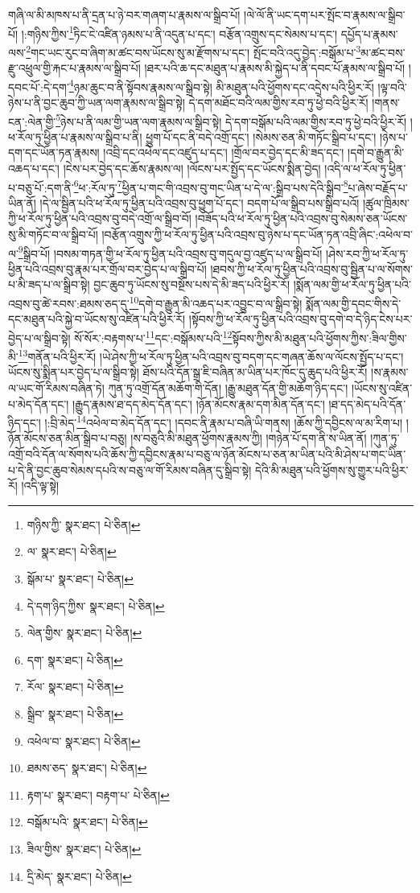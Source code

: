 གཞི་ལ་མི་མཁས་པ་ནི་དྲན་པ་ཉེ་བར་གཞག་པ་རྣམས་ལ་སྒྲིབ་པོ། །ལེ་ལོ་ནི་ཡང་དག་པར་སྤོང་བ་རྣམས་ལ་སྒྲིབ་པོ། །:གཉིས་ཀྱིས་\footnote{གཉིས་ཀྱི་  སྣར་ཐང་།  པེ་ཅིན། }ཏིང་ངེ་འཛིན་ཉམས་པ་ནི་འདུན་པ་དང་། བརྩོན་འགྲུས་དང་སེམས་པ་དང་། དཔྱོད་པ་རྣམས་ལས་\footnote{ལ་  སྣར་ཐང་།  པེ་ཅིན། }གང་ཡང་རུང་བ་ཞིག་མ་ཚང་བས་ཡོངས་སུ་མ་རྫོགས་པ་དང་། སྤོང་བའི་འདུ་བྱེད་:བསྒོམ་པ་\footnote{སྒོམ་པ་  སྣར་ཐང་།  པེ་ཅིན། }མ་ཚང་བས་རྫུ་འཕྲུལ་གྱི་རྐང་པ་རྣམས་ལ་སྒྲིབ་པོ། །ཐར་པའི་ཆ་དང་མཐུན་པ་རྣམས་མི་སྐྱེད་པ་ནི་དབང་པོ་རྣམས་ལ་སྒྲིབ་པོ། །དབང་པོ་:དེ་དག་\footnote{དེ་དག་ཉིད་ཀྱིས་  སྣར་ཐང་།  པེ་ཅིན། }ཉམ་ཆུང་བ་ནི་སྟོབས་རྣམས་ལ་སྒྲིབ་སྟེ། མི་མཐུན་པའི་ཕྱོགས་དང་འདྲེས་པའི་ཕྱིར་རོ། །ལྟ་བའི་ཉེས་པ་ནི་བྱང་ཆུབ་ཀྱི་ཡན་ལག་རྣམས་ལ་སྒྲིབ་སྟེ། དེ་དག་མཐོང་བའི་ལམ་གྱིས་རབ་ཏུ་ཕྱེ་བའི་ཕྱིར་རོ། །གནས་ངན་:ལེན་གྱི་\footnote{ལེན་གྱིས་  སྣར་ཐང་།  པེ་ཅིན། }ཉེས་པ་ནི་ལམ་གྱི་ཡན་ལག་རྣམས་ལ་སྒྲིབ་སྟེ། དེ་དག་བསྒོམ་པའི་ལམ་གྱིས་རབ་ཏུ་ཕྱེ་བའི་ཕྱིར་རོ། །ཕ་རོལ་ཏུ་ཕྱིན་པ་རྣམས་ལ་སྒྲིབ་པ་ནི། ཕྱུག་པོ་དང་ནི་བདེ་འགྲོ་དང་། །སེམས་ཅན་མི་གཏོང་སྒྲིབ་པ་དང་། །ཉེས་པ་དག་དང་ཡོན་ཏན་རྣམས། །འབྲི་དང་འཕེལ་དང་འཛུད་པ་དང་། །གྲོལ་བར་བྱེད་དང་མི་ཟད་དང་། །དགེ་བ་རྒྱུན་མི་འཆད་པ་དང་། །ངེས་པར་བྱེད་དང་ཆོས་རྣམས་ལ། །ལོངས་པར་སྤྱོད་དང་ཡོངས་སྨིན་བྱེད། །འདི་ལ་ཕ་རོལ་ཏུ་ཕྱིན་པ་བཅུ་པོ་:དག་ནི་\footnote{དག་  སྣར་ཐང་།  པེ་ཅིན། }ཕ་:རོལ་ཏུ་\footnote{རོལ་  སྣར་ཐང་།  པེ་ཅིན། }ཕྱིན་པ་གང་གི་འབྲས་བུ་གང་ཡིན་པ་དེ་ལ་:སྒྲིབ་པས་དེའི་སྒྲིབ་\footnote{སྒྲིབ་  སྣར་ཐང་།  པེ་ཅིན། }པ་ཞེས་བརྗོད་པ་ཡིན་ནོ། །དེ་ལ་སྦྱིན་པའི་ཕ་རོལ་ཏུ་ཕྱིན་པའི་འབྲས་བུ་ཕྱུག་པོ་དང་། བདག་པོ་ལ་སྒྲིབ་པས་སྒྲིབ་པའོ། །ཚུལ་ཁྲིམས་ཀྱི་ཕ་རོལ་ཏུ་ཕྱིན་པའི་འབྲས་བུ་བདེ་འགྲོ་ལ་སྒྲིབ་བོ། །བཟོད་པའི་ཕ་རོལ་ཏུ་ཕྱིན་པའི་འབྲས་བུ་སེམས་ཅན་ཡོངས་སུ་མི་གཏོང་བ་ལ་སྒྲིབ་པོ། །བརྩོན་འགྲུས་ཀྱི་ཕ་རོལ་ཏུ་ཕྱིན་པའི་འབྲས་བུ་ཉེས་པ་དང་ཡོན་ཏན་འབྲི་ཞིང་:འཕེལ་བ་ལ་\footnote{འཕེལ་བ་  སྣར་ཐང་།  པེ་ཅིན། }སྒྲིབ་པོ། །བསམ་གཏན་གྱི་ཕ་རོལ་ཏུ་ཕྱིན་པའི་འབྲས་བུ་གདུལ་བྱ་འཛུད་པ་ལ་སྒྲིབ་པོ། །ཤེས་རབ་ཀྱི་ཕ་རོལ་ཏུ་ཕྱིན་པའི་འབྲས་བུ་རྣམ་པར་གྲོལ་བར་བྱེད་པ་ལ་སྒྲིབ་པོ། །ཐབས་ཀྱི་ཕ་རོལ་ཏུ་ཕྱིན་པའི་འབྲས་བུ་སྦྱིན་པ་ལ་སོགས་པ་མི་ཟད་པ་ལ་སྒྲིབ་སྟེ། བྱང་ཆུབ་ཏུ་ཡོངས་སུ་བསྔོས་པས་དེ་མི་ཟད་པའི་ཕྱིར་རོ། །སྨོན་ལམ་གྱི་ཕ་རོལ་ཏུ་ཕྱིན་པའི་འབྲས་བུ་ཚེ་རབས་:ཐམས་ཅད་དུ་\footnote{ཐམས་ཅད་  སྣར་ཐང་།  པེ་ཅིན། }དགེ་བ་རྒྱུན་མི་འཆད་པར་འབྱུང་བ་ལ་སྒྲིབ་སྟེ། སྨོན་ལམ་གྱི་དབང་གིས་དེ་དང་མཐུན་པའི་སྐྱེ་བ་ཡོངས་སུ་འཛིན་པའི་ཕྱིར་རོ། །སྟོབས་ཀྱི་ཕ་རོལ་ཏུ་ཕྱིན་པའི་འབྲས་བུ་དགེ་བ་དེ་ཉིད་ངེས་པར་བྱེད་པ་ལ་སྒྲིབ་སྟེ། སོ་སོར་:བརྟགས་པ་\footnote{རྟག་པ་  སྣར་ཐང་། བརྟག་པ་  པེ་ཅིན། }དང་:བསྒོམས་པའི་\footnote{བསྒོམ་པའི་  སྣར་ཐང་།  པེ་ཅིན། }སྟོབས་ཀྱིས་མི་མཐུན་པའི་ཕྱོགས་ཀྱིས་:ཟིལ་གྱིས་མི་\footnote{ཟིལ་གྱིས་  སྣར་ཐང་།  པེ་ཅིན། }གནོན་པའི་ཕྱིར་རོ། །ཡེ་ཤེས་ཀྱི་ཕ་རོལ་ཏུ་ཕྱིན་པའི་འབྲས་བུ་བདག་དང་གཞན་ཆོས་ལ་ལོངས་སྤྱོད་པ་དང་། ཡོངས་སུ་སྨིན་པར་བྱེད་པ་ལ་སྒྲིབ་སྟེ། ཐོས་པའི་དོན་སྒྲ་ཇི་བཞིན་མ་ཡིན་པར་ཁོང་དུ་ཆུད་པའི་ཕྱིར་རོ། །ས་རྣམས་ལ་ཡང་གོ་རིམས་བཞིན་ཏེ། ཀུན་ཏུ་འགྲོ་དོན་མཆོག་གི་དོན། །རྒྱུ་མཐུན་དོན་གྱི་མཆོག་ཉིད་དང་། །ཡོངས་སུ་འཛིན་པ་མེད་དོན་དང་། །རྒྱུད་རྣམས་ཐ་དད་མེད་དོན་དང་། །ཉོན་མོངས་རྣམ་དག་མིན་དོན་དང་། །ཐ་དད་མེད་པའི་དོན་ཉིད་དང་། །:བྲི་མེད་\footnote{དྲི་མེད་  སྣར་ཐང་།  པེ་ཅིན། }འཕེལ་བ་མེད་དོན་དང་། །དབང་ནི་རྣམ་པ་བཞི་ཡི་གནས། །ཆོས་ཀྱི་དབྱིངས་ལ་མ་རིག་པ། །ཉོན་མོངས་ཅན་མིན་སྒྲིབ་པ་བཅུ། །ས་བཅུའི་མི་མཐུན་ཕྱོགས་རྣམས་ཀྱི། །གཉེན་པོ་དག་ནི་ས་ཡིན་ནོ། །ཀུན་ཏུ་འགྲོ་བའི་དོན་ལ་སོགས་པའི་ཆོས་ཀྱི་དབྱིངས་རྣམ་པ་བཅུ་ལ་ཉོན་མོངས་པ་ཅན་མ་ཡིན་པའི་མི་ཤེས་པ་གང་ཡིན་པ་དེ་ནི་བྱང་ཆུབ་སེམས་དཔའི་ས་བཅུ་ལ་གོ་རིམས་བཞིན་དུ་སྒྲིབ་སྟེ། དེའི་མི་མཐུན་པའི་ཕྱོགས་སུ་གྱུར་པའི་ཕྱིར་རོ། །འདི་ལྟ་སྟེ། 